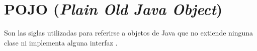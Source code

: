 \section{POJO (\textit{Plain Old Java Object})}

Son las siglas utilizadas para referirse a objetos de Java que no extiende ninguna clase ni implementa alguna interfaz \cite{POJO0}.